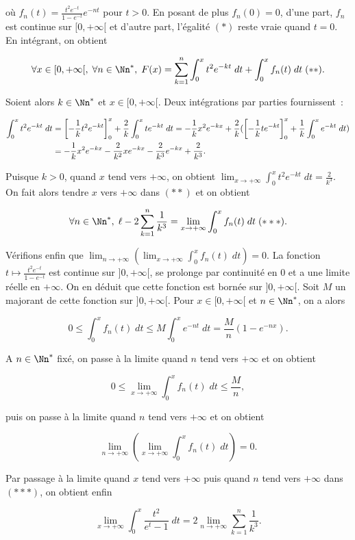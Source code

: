 {\begin{enumerate}
{où $f_n(t)=\frac{t^2e^{-t}}{1-e^{-t}}e^{-nt}$ pour $t>0$. En posant de plus $f_n(0)=0$, d'une part, $f_n$ est continue sur $[0,+\infty[$ et d'autre part, l'égalité $(*)$ reste vraie quand $t=0$. En intégrant, on obtient

$$\forall x\in[0,+\infty[,\;\forall n\in\Nn^*,\;F(x)=\sum_{k=1}^{n}\int_{0}^{x}t^2e^{-kt}\;dt+\int_{0}^{x}f_n(t)\;dt\;(**).$$

Soient alors $k\in\Nn^*$ et $x\in[0,+\infty[$. Deux intégrations par parties fournissent~:

\begin{align*}\ensuremath
\int_{0}^{x}t^2e^{-kt}\;dt&=\left[-\frac{1}{k}t^2e^{-kt}\right]_{0}^{x}+\frac{2}{k}\int_{0}^{x}te^{-kt}\;dt
=-\frac{1}{k}x^2e^{-kx}+\frac{2}{k}(\left[-\frac{1}{k}te^{-kt}\right]_{0}^{x}+\frac{1}{k}\int_{0}^{x}e^{-kt}\;dt)\\
 &=-\frac{1}{k}x^2e^{-kx}-\frac{2}{k^2}xe^{-kx}-\frac{2}{k^3}e^{-kx}+\frac{2}{k^3}.
\end{align*}

Puisque $k>0$, quand $x$ tend vers $+\infty$, on obtient $\lim_{x\rightarrow +\infty}\int_{0}^{x}t^2e^{-kt}\;dt=\frac{2}{k^3}$. On fait alors tendre $x$ vers $+\infty$ dans $(**)$ et on obtient

$$\forall n\in\Nn^*,\;\ell-2\sum_{k=1}^{n}\frac{1}{k^3}=\lim_{x\rightarrow +\infty}\int_{0}^{x}f_n(t)\;dt\;(***).$$

Vérifions enfin que $\lim_{n\rightarrow +\infty}\left(\lim_{x\rightarrow +\infty}\int_{0}^{x}f_n(t)\;dt\right)=0$. La fonction $t\mapsto\frac{t^2e^{-t}}{1-e^{-t}}$ est continue sur $]0,+\infty[$, se prolonge par continuité en $0$ et a une limite réelle en $+\infty$. On en déduit que cette fonction est bornée sur $]0,+\infty[$. Soit $M$ un majorant de cette fonction sur $]0,+\infty[$. Pour $x\in[0,+\infty[$ et $n\in\Nn^*$, on a alors

$$0\leq\int_{0}^{x}f_n(t)\;dt\leq M\int_{0}^{x}e^{-nt}\;dt=\frac{M}{n}(1-e^{-nx}).$$

A $n\in\Nn^*$ fixé, on passe à la limite quand $n$ tend vers $+\infty$ et on obtient

$$0\leq\lim_{x\rightarrow +\infty}\int_{0}^{x}f_n(t)\;dt\leq\frac{M}{n},$$

puis on passe à la limite quand $n$ tend vers $+\infty$ et on obtient

$$\lim_{n\rightarrow +\infty}\left(\lim_{x\rightarrow +\infty}\int_{0}^{x}f_n(t)\;dt\right)=0.$$

Par passage à la limite quand $x$ tend vers $+\infty$ puis quand $n$ tend vers $+\infty$ dans $(***)$, on obtient enfin

$$\lim_{x\rightarrow +\infty}\int_{0}^{x}\frac{t^2}{e^t-1}\;dt=2\lim_{n\rightarrow +\infty}\sum_{k=1}^{n}\frac{1}{k^3}.$$}
\end{enumerate}
}
